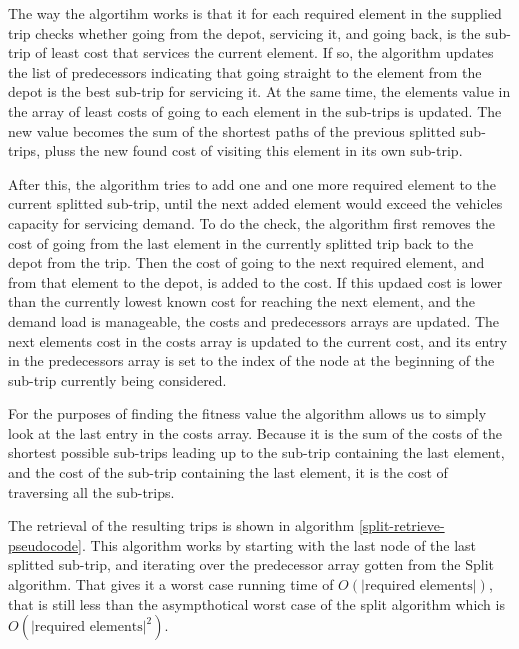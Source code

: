 The way the algortihm works is that it for each required element in the supplied trip checks whether going from the depot, servicing it, and going back, is the sub-trip of least cost that services the current element. If so, the algorithm updates the list of predecessors indicating that going straight to the element from the depot is the best sub-trip for servicing it. At the same time, the elements value in the array of least costs of going to each element in the sub-trips is updated. The new value becomes the sum of the shortest paths of the previous splitted sub-trips, pluss the new found cost of visiting this element in its own sub-trip.

After this, the algorithm tries to add one and one more required element to the current splitted sub-trip, until the next added element would exceed the vehicles capacity for servicing demand. 
To do the check, the algorithm first removes the cost of going from the last element in the currently splitted trip back to the depot from the trip. Then the cost of going to the next required element, and from that element to the depot, is added to the cost. If this updaed cost is lower than the currently lowest known cost for reaching the next element, and the demand load is manageable, the costs and predecessors arrays are updated. The next elements cost in the costs array is updated to the current cost, and its entry in the predecessors array is set to the index of the node at the beginning of the sub-trip currently being considered.

For the purposes of finding the fitness value the algorithm allows us to simply look at the last entry in the costs array. Because it is the sum of the costs of the shortest possible sub-trips leading up to the sub-trip containing the last element, and the cost of the sub-trip containing the last element, it is the cost of traversing all the sub-trips.

The retrieval of the resulting trips is shown in algorithm \ref{split-retrieve-pseudocode}. This algorithm works by starting with the last node of the last splitted sub-trip, and iterating over the predecessor array gotten from the Split algorithm. That gives it a worst case running time of $O(|\text{required elements}|)$, that is still less than the asympthotical worst case of the split algorithm which is $O(|\text{required elements}|^2)$.

